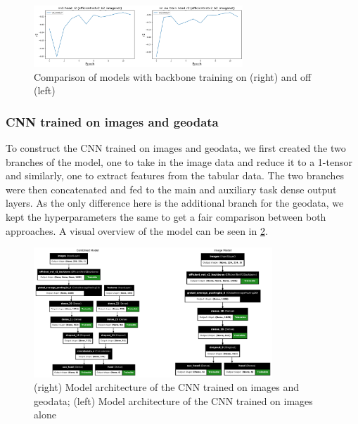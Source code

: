 \documentclass[12pt,a4paper,oneside]{article}
\begin{document}

\begin{figure}[!h]
    \centering
    \includegraphics[width=0.7\textwidth]{assets/train_vs_notrain.png}
    \caption{Comparison of models with backbone training on (right) and off (left)}
    \label{fig:backbone_training}
\end{figure}

\subsubsection{CNN trained on images and geodata}

To construct the CNN trained on images and geodata, we first created the two branches of the model, one to take in the image data and reduce it to a 1-tensor and similarly, one to extract features from the tabular data. The two branches were then concatenated and fed to the main and auxiliary task dense output layers. As the only difference here is the additional branch for the geodata, we kept the hyperparameters the same to get a fair comparison between both approaches. A visual overview of the model can be seen in \ref{fig:geodata_model}.

\begin{figure}[!h]
    \centering 
    \includegraphics[width=0.8\textwidth]{assets/img_geo_model.png}
    \caption{(right) Model architecture of the CNN trained on images and geodata; (left) Model architecture of the CNN trained on images alone}
    \label{fig:geodata_model}
\end{figure}
\end{document}

